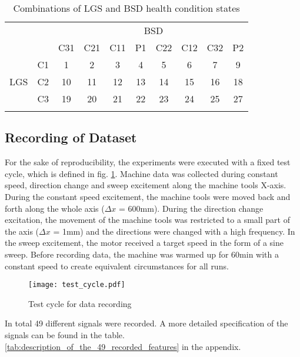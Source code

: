 \begin{center}
\begin{longtable}{c c c c c c c c c c} 
\toprule
  &  &    &     &     &     \multicolumn{2}{c}{BSD}     &     &     &    \\ 
  &  & C31 & C21 & C11 & P1  & C22 & C12 & C32 & P2 \\ 
\midrule
     & \multicolumn{1}{c|}{C1} & 1 & 2 & 3 & 4 & 5 & 6 & 7 & 9 \\ 
 LGS & \multicolumn{1}{c|}{C2}& 10 & 11 & 12 & 13 & 14 & 15 & 16 & 18 \\  
     & \multicolumn{1}{c|}{C3} & 19 & 20 & 21 & 22 & 23 & 24 & 25 & 27 \\ 
\bottomrule
\caption {Combinations of LGS and BSD health condition states}
\label {tab:recorded_combinations_of_LGS_and_BSD_health_conditions}
\end{longtable}
\end{center}


\subsection{Recording of Dataset}
For the sake of reproducibility, the experiments were executed with a fixed test cycle, which is defined in fig. \ref{fig:test_cycle}. Machine data was collected during constant speed, direction change and sweep excitement along the machine tools X-axis. During the constant speed excitement, the machine tools were moved back and forth along the whole axis ($\Delta x$ = 600mm). During the direction change excitation, the movement of the machine tools was restricted to a small part of the axis ($\Delta x$ = 1mm) and the directions were changed with a high frequency. In the sweep excitement, the motor received a target speed in the form of a sine sweep. Before recording data, the machine was warmed up for 60min with a constant speed to create equivalent circumstances for all runs.

\begin{figure}[H]
  \centering
  \texttt{[image: test\_cycle.pdf]}
  \caption {Test cycle for data recording}
  \label{fig:test_cycle}
\end{figure}

In total 49 different signals were recorded. A more detailed specification of the signals can be found in the table. \ref{tab:description_of_the_49_recorded_features} in the appendix.

